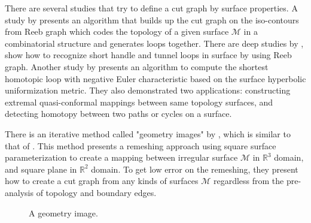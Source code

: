 \documentclass[a4paper,twoside]{article}
\begin{document}
There are several studies that try to define a cut graph by surface properties. A study by \cite{Patane:2007:FCB:1224804.1224947} presents an algorithm that builds up the cut graph on the iso-contours from Reeb graph which codes the topology of a given surface $\mathscr{M}$ in a combinatorial structure and generates loops together. There are deep studies by \cite{Dey:2008:CGH:1360612.1360644,Dey:2013:ECH:2461912.2462017}, show how to recognize short handle and tunnel loops in surface by using Reeb graph.  Another study by \cite{Jin:2013:CSH:2396897.2396971} presents an algorithm to compute the shortest homotopic loop with negative Euler characteristic based on the surface hyperbolic uniformization metric. They also demonstrated two applications: constructing extremal quasi-conformal mappings between same topology surfaces, and detecting homotopy between two paths or cycles on a surface. 

There is an iterative method called "geometry images" by \cite{Gu:2002:GI:566654.566589}, which is similar to that of \cite{Dey:1994:NTC:177424.178001}. This method presents a remeshing approach using square surface parameterization to create a mapping between irregular surface $\mathscr{M}$ in $\mathbb{R}^3$ domain, and square plane in $\mathbb{R}^2$ domain. To get low error on the remeshing, they present how to create a cut graph from any kinds of surfaces $\mathscr{M}$ regardless from the pre-analysis of topology and boundary edges.

\begin{figure}[!h]
	\centering
	\hspace{10pt}
	
	\caption{A geometry image.}
	\label{fig:gim figure}
\end{figure}
\end{document}

